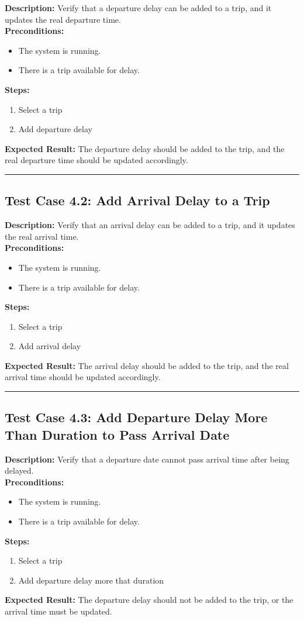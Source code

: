 \documentclass{article}
\begin{document}
\textbf{Description:} Verify that a departure delay can be added to a trip, and it updates the real departure time.\\
\textbf{Preconditions:}
\begin{itemize}
  \item The system is running.
  \item There is a trip available for delay.
\end{itemize}
\textbf{Steps:}
\begin{enumerate}
  \item Select a trip
  \item Add departure delay
\end{enumerate}
\textbf{Expected Result:} The departure delay should be added to the trip, and the real departure time should be updated accordingly.

\bigskip
\hrule
\bigskip

\subsection{Test Case 4.2: Add Arrival Delay to a Trip}

\textbf{Description:} Verify that an arrival delay can be added to a trip, and it updates the real arrival time.\\
\textbf{Preconditions:}
\begin{itemize}
  \item The system is running.
  \item There is a trip available for delay.
\end{itemize}
\textbf{Steps:}
\begin{enumerate}
    \item Select a trip
    \item Add arrival delay
\end{enumerate}
\textbf{Expected Result:} The arrival delay should be added to the trip, and the real arrival time should be updated accordingly.

\bigskip
\hrule
\bigskip

\subsection{Test Case 4.3: Add Departure Delay More Than Duration to Pass Arrival Date}

\textbf{Description:} Verify that a departure date cannot pass arrival time after being delayed.\\
\textbf{Preconditions:}
\begin{itemize}
  \item The system is running.
  \item There is a trip available for delay.
\end{itemize}
\textbf{Steps:}
\begin{enumerate}
    \item Select a trip
    \item Add departure delay more that duration
\end{enumerate}
\textbf{Expected Result:} The departure delay should not be added to the trip, or the arrival time must be updated.
\end{document}
